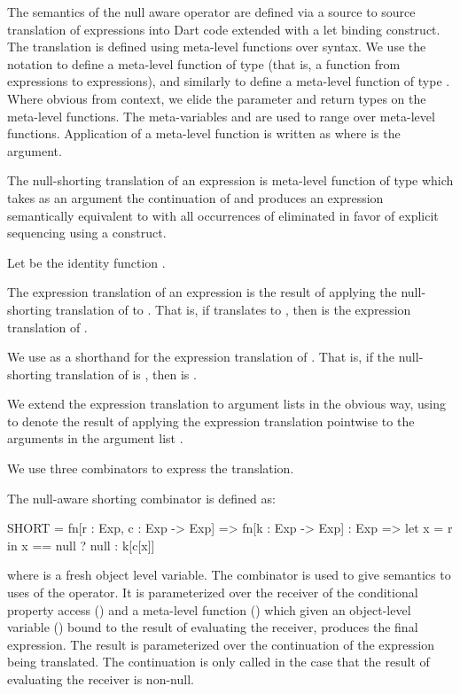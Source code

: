 \documentclass[makeidx]{article}
\begin{document}
{The semantics of the null aware operator  are defined via a source to source
translation of expressions into Dart code extended with a let binding construct.
The translation is defined using meta-level functions over syntax.  We use the
notation  to define a meta-level function of type  (that is, a function from expressions to expressions), and similarly
 to define a meta-level function of type .  Where obvious from context, we elide the parameter and return
types on the meta-level functions.  The meta-variables  and  are used to
range over meta-level functions.  Application of a meta-level function is
written as  where  is the argument.

The null-shorting translation of an expression  is meta-level function  of
type  which takes as an argument the continuation of  and
produces an expression semantically equivalent to  with all occurrences of
 eliminated in favor of explicit sequencing using a  construct.

Let  be the identity function .

The expression translation of an expression  is the result of applying the
null-shorting translation of  to .  That is, if  translates to ,
then  is the expression translation of .

We use  as a shorthand for the expression translation of .  That is,
if the null-shorting translation of  is , then  is .

We extend the expression translation to argument lists in the obvious way, using
 to denote the result of applying the expression translation
pointwise to the arguments in the argument list .

We use three combinators to express the translation.

The null-aware shorting combinator  is defined as:
\begin{dartCode}
  SHORT = fn[r : Exp, c : Exp -> Exp] =>
              fn[k : Exp -> Exp] : Exp =>
                let x = r in x == null ? null : k[c[x]]
\end{dartCode}

where  is a fresh object level variable.  The  combinator is used to
give semantics to uses of the  operator.  It is parameterized over the
receiver of the conditional property access () and a meta-level function
() which given an object-level variable () bound to the result of
evaluating the receiver, produces the final expression.  The result is
parameterized over the continuation of the expression being translated.  The
continuation is only called in the case that the result of evaluating the
receiver is non-null.

}
\end{document}
